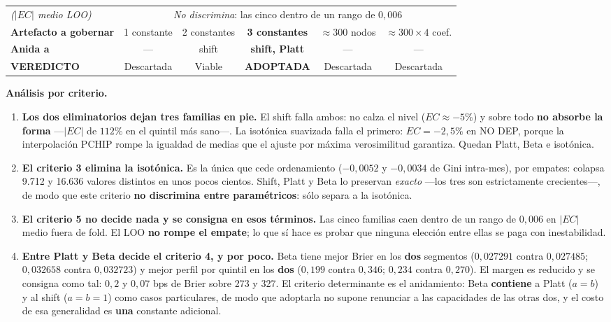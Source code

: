\documentclass[12pt, a4paper]{article}
\begin{document}
\begin{table}[H]
{\begin{tabular}{lccccc}
\emph{($|EC|$ medio LOO)} & \multicolumn{5}{c}{\emph{No discrimina}: las cinco dentro de un rango de $0{,}006$} \\
\addlinespace
\midrule
\textbf{Artefacto a gobernar} & 1 constante & 2 constantes & \textbf{3 constantes} & $\approx300$ nodos & $\approx300\times4$ coef. \\
\textbf{Anida a} & --- & shift & \textbf{shift, Platt} & --- & --- \\
\midrule
\textbf{VEREDICTO} & \textcolor{semrojo}{Descartada} & Viable & \textcolor{semverde}{\textbf{ADOPTADA}} & \textcolor{semrojo}{Descartada} & \textcolor{semrojo}{Descartada} \\
\bottomrule
\end{tabular}%
}
\end{table}

\noindent\textbf{Análisis por criterio.}

\begin{enumerate}[nosep]
  \item \textbf{Los dos eliminatorios dejan tres familias en pie.} El shift falla ambos: no calza
    el nivel ($EC\approx-5\%$) y sobre todo \textbf{no absorbe la forma} ---$|EC|$ de $112\%$ en el
    quintil más sano---. La isotónica suavizada falla el primero: $EC=-2{,}5\%$ en NO DEP, porque
    la interpolación PCHIP rompe la igualdad de medias que el ajuste por máxima verosimilitud
    garantiza. Quedan Platt, Beta e isotónica.
  \item \textbf{El criterio 3 elimina la isotónica.} Es la única que cede ordenamiento
    ($-0{,}0052$ y $-0{,}0034$ de Gini intra-mes), por empates: colapsa 9.712 y 16.636 valores
    distintos en unos pocos cientos. Shift, Platt y Beta lo preservan \emph{exacto} ---los tres son
    estrictamente crecientes---, de modo que este criterio \textbf{no discrimina entre
    paramétricos}: sólo separa a la isotónica.
  \item \textbf{El criterio 5 no decide nada y se consigna en esos términos.} Las cinco familias caen dentro de
    un rango de $0{,}006$ en $|EC|$ medio fuera de fold. El LOO \textbf{no rompe el empate}; lo que
    sí hace es probar que ninguna elección entre ellas se paga con inestabilidad.
  \item \textbf{Entre Platt y Beta decide el criterio 4, y por poco.} Beta tiene mejor Brier en los
    \textbf{dos} segmentos ($0{,}027291$ contra $0{,}027485$; $0{,}032658$ contra $0{,}032723$) y
    mejor perfil por quintil en los \textbf{dos} ($0{,}199$ contra $0{,}346$; $0{,}234$ contra
    $0{,}270$). El margen es reducido y se consigna como tal: $0{,}2$ y $0{,}07$ bps de
    Brier sobre 273 y 327. El criterio determinante es el anidamiento: Beta
    \textbf{contiene} a Platt ($a=b$) y al shift ($a=b=1$) como casos particulares, de modo que
    adoptarla no supone renunciar a las capacidades de las otras dos, y el costo de esa
    generalidad es \textbf{una} constante adicional.
\end{enumerate}
\end{document}
